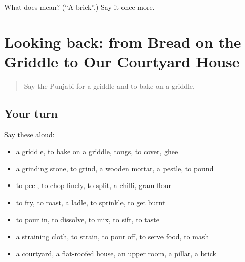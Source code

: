 \begin{tcolorbox}[breakable,colback=teal!4,colframe=teal!35!black,title={Before you move on}]
What does  mean? (\textquotedblleft{}A brick\textquotedblright{}.) Say it once more.
\end{tcolorbox}
\section[(dialogue)]{Looking back: from Bread on the Griddle to Our Courtyard House}

\label{lesson:PA-R245-review-239-245}



\begin{quote}
Say the Punjabi for a griddle and to bake on a griddle.
\end{quote}

\subsection*{Your turn}
Say these aloud:

\begin{itemize}
\raggedright
  \item a griddle, to bake on a griddle, tongs, to cover, ghee
  \item a grinding stone, to grind, a wooden mortar, a pestle, to pound
  \item to peel, to chop finely, to split, a chilli, gram flour
  \item to fry, to roast, a ladle, to sprinkle, to get burnt
  \item to pour in, to dissolve, to mix, to sift, to taste
  \item a straining cloth, to strain, to pour off, to serve food, to mash
  \item a courtyard, a flat-roofed house, an upper room, a pillar, a brick
\end{itemize}

